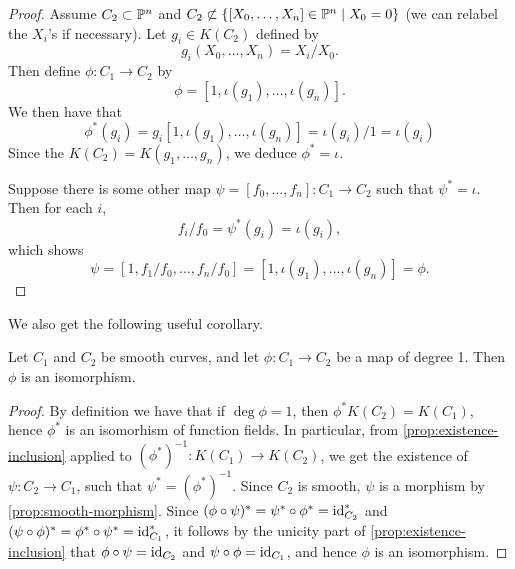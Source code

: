 \begin{proof}
	Assume $C_2 \subset \mathbb{P}^n$ and $C_2 \not\subset \{[X_0, \dots, X_n] \in
	\mathbb{P}^n \mid X_0 = 0\}$ (we can relabel the $X_i$'s if necessary).
	Let $g_i \in K(C_2)$ defined by 
	\begin{equation*}
		g_i(X_0, \dots, X_n) = X_i/X_0.
	\end{equation*}
	Then define $\phi: C_1 \to C_2$ by
	\begin{equation*}
		\phi = [1, \iota(g_1), \dots, \iota(g_n)].
	\end{equation*}
	We then have that
	\begin{equation*}
		\phi^*(g_i) = g_i[1, \iota(g_1), \dots, \iota(g_n)]	
		= \iota(g_i)/1 = \iota(g_i)
	\end{equation*}
	Since the $K(C_2) = K(g_1, \dots, g_n)$, we deduce
	$\phi^* = \iota$.

	Suppose there is some other map $\psi = [f_0, \dots, f_n]: C_1 \to C_2$
	such that $\psi^* = \iota$. Then for each $i$,
	\begin{equation*}
		f_i/f_0 = \psi^*(g_i) = \iota(g_i),
	\end{equation*}
	which shows
	\begin{equation*}
		\psi = [1, f_1/f_0, \dots, f_n/f_0] = [1, \iota(g_1), \dots, \iota(g_n)]
		= \phi.
	\end{equation*}
\end{proof}

We also get the following useful corollary.
\begin{corollary}
	\label{cor:deg-1-isom}
	Let $C_1$ and $C_2$ be smooth curves, and let $\phi: C_1 \to C_2$
	be a map of degree 1. Then $\phi$ is an isomorphism.
\end{corollary}

\begin{proof}
	By definition we have that if $\deg \phi = 1$, then $\phi^*K(C_2) = K(C_1)$,
	hence $\phi^*$ is an isomorhism of function fields.
	In particular, from \ref{prop:existence-inclusion} applied to
	$(\phi^*)^{-1}: K(C_1) \to K(C_2)$, we get the existence
	of $\psi: C_2 \to C_1$, such that $\psi^* = (\phi^*)^{-1}$.
	Since $C_2$ is smooth, $\psi$ is a morphism by \ref{prop:smooth-morphism}.
	Since $(\phi \circ \psi)^* = \psi^* \circ \phi^* = \operatorname{id}_{C_2}^*$
	and $(\psi\circ \phi)^* = \phi^* \circ \psi^* = \operatorname{id}_{C_1}^*$,
	it follows by the unicity part of \ref{prop:existence-inclusion}
	that $\phi\circ\psi = \operatorname{id}_{C_2}$ and $\psi\circ\phi = \operatorname{id}_{C_1}$, and
	hence $\phi$ is an isomorphism.
\end{proof}

